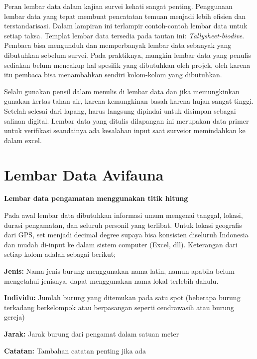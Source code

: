 \documentclass[
  oneside]{book}
\begin{document}
Peran lembar data dalam kajian survei kehati sangat penting. Penggunaan lembar data yang tepat membuat pencatatan temuan menjadi lebih efisien dan terstandarisasi. Dalam lampiran ini terlampir contoh-contoh lembar data untuk setiap taksa. Templat lembar data tersedia pada tautan ini: \emph{Tallysheet-biodive}. Pembaca bisa mengunduh dan memperbanyak lembar data sebanyak yang dibutuhkan sebelum survei. Pada praktiknya, mungkin lembar data yang penulis sediakan belum mencakup hal spesifik yang dibutuhkan oleh projek, oleh karena itu pembaca bisa menambahkan sendiri kolom-kolom yang dibutuhkan.

Selalu gunakan pensil dalam menulis di lembar data dan jika memungkinkan gunakan kertas tahan air, karena kemungkinan basah karena hujan sangat tinggi. Setelah selesai dari lapang, harus langsung dipindai untuk disimpan sebagai salinan digital. Lembar data yang ditulis dilapangan ini merupakan data primer untuk verifikasi seandainya ada kesalahan input saat surveior memindahkan ke dalam excel.

\hypertarget{lembar-data-avifauna}{%
\section*{Lembar Data Avifauna}\label{lembar-data-avifauna}}

\textbf{Lembar data pengamatan menggunakan titik hitung}

Pada awal lembar data dibutuhkan informasi umum mengenai tanggal, lokasi, durasi pengamatan, dan seluruh personil yang terlibat. Untuk lokasi geografis dari GPS, set menjadi decimal degree supaya bisa konsisten diseluruh Indonesia dan mudah di-input ke dalam sistem computer (Excel, dll). Keterangan dari setiap kolom adalah sebagai berikut;

\textbf{Jenis:} Nama jenis burung menggunakan nama latin, namun apabila belum mengetahui jenisnya, dapat menggunakan nama lokal terlebih dahulu.

\textbf{Individu:} Jumlah burung yang ditemukan pada satu spot (beberapa burung terkadang berkelompok atau berpasangan seperti cendrawasih atau burung gereja)

\textbf{Jarak:} Jarak burung dari pengamat dalam satuan meter

\textbf{Catatan:} Tambahan catatan penting jika ada
\end{document}
